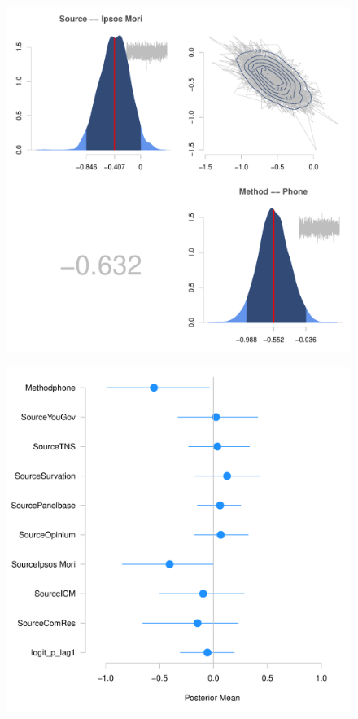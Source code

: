 \documentclass{../../tex_template/asaproc}
\begin{document}
\begin{figure}[H]
  \includegraphics[scale=.5]{figs/posts.pdf}
  \caption{\small }
  \label{fig:posts}
\end{figure}

\begin{figure}[H]
  \includegraphics[scale=.5]{figs/allposts.pdf}
  \caption{\small }
  \label{fig:allposts}
\end{figure}
\end{document}

